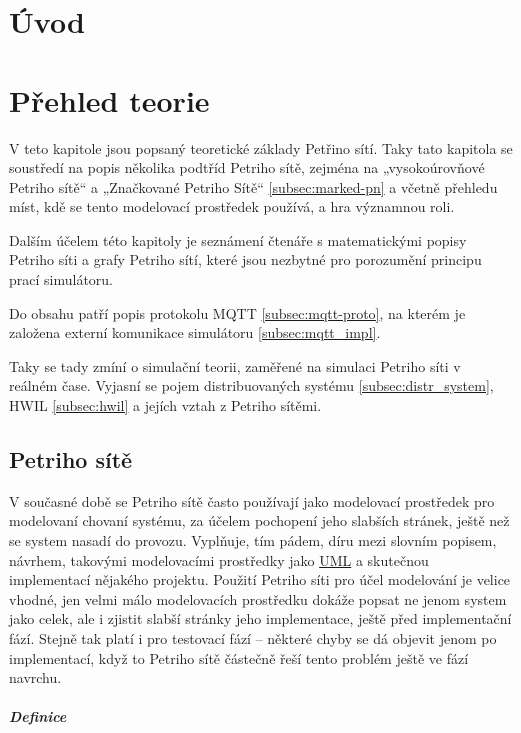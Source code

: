 \chapter{Úvod}
\chapter{Přehled teorie}
\label{prehled}

V teto kapitole jsou popsaný teoretické základy Petřino sítí. Taky tato kapitola se soustředí na popis několika podtříd Petriho sítě, zejména na „vysokoúrovňové Petriho sítě“ a „Značkované Petriho Sítě“ \ref{subsec:marked-pn} a  včetně přehledu míst, kdě se tento modelovací prostředek používá, a hra významnou roli.

Dalším účelem této kapitoly je seznámení čtenáře s matematickými popisy Petriho síti a grafy Petriho sítí, které jsou nezbytné pro porozumění principu prací simulátoru.

Do obsahu patří popis protokolu MQTT \ref{subsec:mqtt-proto}, na kterém je založena externí komunikace simulátoru \ref{subsec:mqtt_impl}.

Taky se tady zmíní o simulační teorii, zaměřené na simulaci Petriho síti v reálném čase. Vyjasní se pojem distribuovaných systému \ref{subsec:distr_system}, HWIL \ref{subsec:hwil} a jejích vztah z Petriho sítěmi.

\section{Petriho sítě}
V současné době se Petriho sítě často používají jako modelovací prostředek pro modelovaní chovaní systému, za účelem pochopení jeho slabších stránek, ještě než se system nasadí do provozu. Vyplňuje, tím pádem, díru mezi slovním popisem, návrhem, takovými modelovacími prostředky jako \href{https://en.wikipedia.org/wiki/Unified_Modeling_Language}{UML} a skutečnou implementací nějakého projektu. Použití Petriho síti pro účel modelování je velice vhodné, jen velmi málo modelovacích prostředku dokáže popsat ne jenom system jako celek, ale i zjistit slabší stránky jeho implementace, ještě před implementační fází. Stejně tak platí i pro testovací fází -- některé chyby se dá objevit jenom po implementací, když to Petriho sítě částečně řeší tento problém ještě ve fází navrchu.

\paragraph{Definice}

